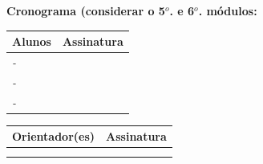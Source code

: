 \documentclass[
	hidelinks,
	12pt,				%
	openright,			%
	oneside,			%
	a4paper,			%
	english,			%
	french,				%
	spanish,			%
	brazil,				%
]{abntex2}
\newcommand{\imprimirorient}{\oorient}
\newcommand{\imprimircoorient}{\ocoorient}
\newcommand{\imprimirautorA}{\oautorA}
\newcommand{\imprimirprontuarioA}{\oprontuarioA}
\newcommand{\imprimirautorB}{\oautorB}
\newcommand{\imprimirprontuarioB}{\oprontuarioB}
\newcommand{\imprimirautorC}{\oautorC}
\newcommand{\imprimirprontuarioC}{\oprontuarioC}
\begin{document}
\begin{flushleft}
\textbf{Cronograma (considerar o 5$^o$. e 6$^o$. módulos:}
\end{flushleft} 




\vspace{1cm}

\begin{center}
	\begin{tabular}{|m{10cm}|m{5cm}|}
		\hline
		\textbf{Alunos} & \textbf{Assinatura} \\
		\hline
		 \textit{\imprimirprontuarioA - \imprimirautorA} &  \\
		\hline
		\textit{\imprimirprontuarioB - \imprimirautorB} &  \\
		\hline
		\textit{\imprimirprontuarioC - \imprimirautorC} & \\
		\hline
	\end{tabular}
\end{center}

\vspace{0.5cm}

\begin{center}
	\begin{tabular}{|m{10cm}|m{5cm}|}
		\hline
		\textbf{Orientador(es)} & \textbf{Assinatura} \\
		\hline
		\textit{\imprimirorient} & \\
		\hline
		\textit{\imprimircoorient} & \\
		\hline
	\end{tabular}
\end{center}


\end{document}
